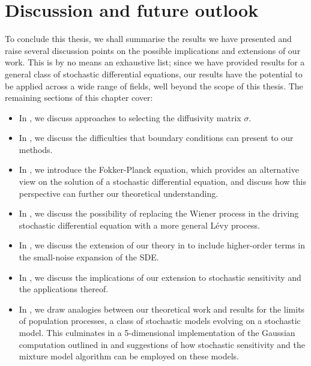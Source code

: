 \chapter{Discussion and future outlook}\label{ch:outlook}
To conclude this thesis, we shall summarise the results we have presented and raise several discussion points on the possible implications and extensions of our work.
This is by no means an exhaustive list; since we have provided results for a general class of stochastic differential equations, our results have the potential to be applied across a wide range of fields, well beyond the scope of this thesis.
The remaining sections of this chapter cover:
\begin{itemize}
	\item In , we discuss approaches to selecting the diffusivity matrix \(\sigma\).
	\item In , we discuss the difficulties that boundary conditions can present to our methods.
	\item In , we introduce the Fokker-Planck equation, which provides an alternative view on the solution of a stochastic differential equation, and discuss how this perspective can further our theoretical understanding.
	\item In , we discuss the possibility of replacing the Wiener process in the driving stochastic differential equation with a more general L\'evy process.
	\item In , we discuss the extension of our theory in  to include higher-order terms in the small-noise expansion of the SDE.
	\item In , we discuss the implications of our extension to stochastic sensitivity and the applications thereof.
	\item In , we draw analogies between our theoretical work and results for the limits of population processes, a class of stochastic models evolving on a stochastic model.
	      This culminates in a 5-dimensional implementation of the Gaussian computation outlined in  and suggestions of how stochastic sensitivity and the mixture model algorithm can be employed on these models.
\end{itemize}

